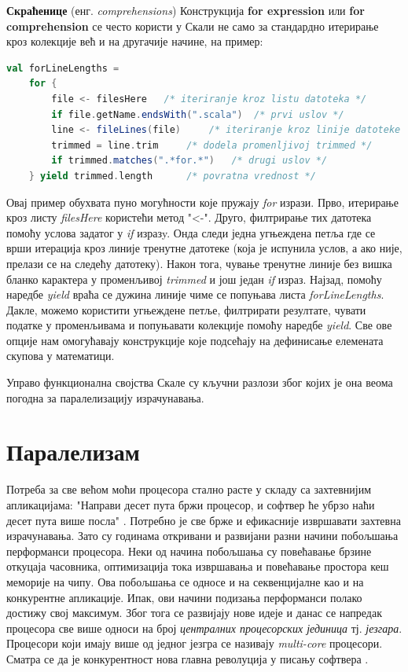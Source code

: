 \documentclass[12pt,oneside]{memoir}
\begin{document}
\begin{description}
\item \textbf{Скраћенице} (енг. \textit{comprehensions})
Конструкција \textbf{for expression} или \textbf{for comprehension} се често користи у Скали не само за стандардно итерирање кроз колекције већ и на другачије начине, на пример:
\begin{lstlisting}[language=Scala]
val forLineLengths =
	for {
		file <- filesHere 	/* iteriranje kroz listu datoteka */
		if file.getName.endsWith(".scala") 	/* prvi uslov */
		line <- fileLines(file) 	/* iteriranje kroz linije datoteke */
		trimmed = line.trim 	/* dodela promenljivoj trimmed */
		if trimmed.matches(".*for.*") 	/* drugi uslov */
	} yield trimmed.length 		/* povratna vrednost */
\end{lstlisting}
Овај пример обухвата пуно могућности које пружају \textit{for} изрази. Прво, итерирање кроз листу \textit{filesHere} користећи метод "<-". Друго, филтрирање тих датотека помоћу услова задатог у \textit{if} изразy. Онда следи једна угњеждена петља где се врши итерација кроз линије тренутне датотеке (која је испунила услов, а ако није, прелази се на следећу датотеку). Након тога, чување тренутне линије без вишка бланко карактера у променљивој \textit{trimmed} и још један \textit{if} израз. Најзад, помоћу наредбе \textit{yield} враћа се дужина линије чиме се попуњава листа \textit{forLineLengths}. Дакле, можемо користити угњеждене петље, филтрирати резултате, чувати податке у променљивама и попуњавати колекције помоћу наредбе \textit{yield}. Све ове опције нам омогућавају конструкције које подсећају на дефинисање елемената скупова у математици.
\end{description}

\par Управо функционална својства Скале су кључни разлози због којих је она веома погодна за паралелизацију израчунавања. 

\section{Паралелизам}
\label{sec:paralelizam}

Потреба за све већом моћи процесора стално расте у складу са захтевнијим апликацијама: "Направи десет пута бржи процесор, и софтвер ће убрзо наћи десет пута више посла" \cite{freeLunch}. Потребно је све брже и ефикасније извршавати захтевна израчунавања. Зато су годинама откривани и развијани разни начини побољшања перформанси процесора. Неки од начина побољшања су повећавање брзине откуцаја часовника, оптимизација тока извршавања и повећавање простора кеш меморије на чипу. Ова побољшања се односе и на секвенцијалне као и на конкурентне апликације. Ипак, ови начини подизања перформанси полако достижу свој максимум. Због тога се развијају нове идеје и данас се напредак процесора све више односи на број \textit{централних процесорских јединица} тј. \textit{језгара}. Процесори који имају више од једног језгра се називају \textit{multi-core} процесори. Сматра се да је конкурентност нова главна револуција у писању софтвера \cite{freeLunch, survey}.
\end{document}
